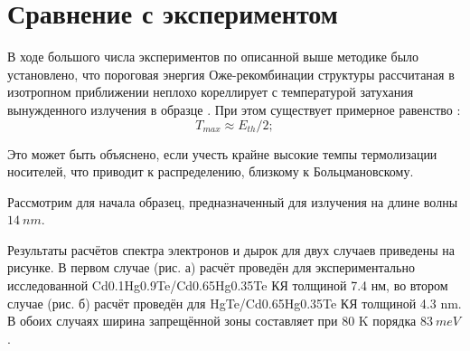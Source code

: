 \documentclass[../main.tex]{subfiles}
\begin{document}
    \section{Сравнение с экспериментом}
    В ходе большого числа экспериментов по описанной выше методике было установлено, что пороговая энергия 
    Оже-рекомбинации структуры рассчитаная в изотропном приближении неплохо кореллирует с температурой затухания 
    вынужденного излучения в образце . При этом существует примерное равенство \cite{TmaxEthEq}:
    \begin{equation}
        T_{max} \approx E_{th} / 2;
    \end{equation}

    Это может быть объяснено, если учесть крайне высокие темпы термолизации носителей, что приводит
    к распределению, близкому к Больцмановскому.

    Рассмотрим для начала образец, предназначенный для излучения на длине волны $14~nm$.

    Результаты расчётов спектра электронов и дырок для двух случаев приведены на рисунке. В первом случае (рис. а) расчёт
    проведён для экспериментально исследованной Cd0.1Hg0.9Te/Cd0.65Hg0.35Te КЯ толщиной 7.4 нм, во втором случае (рис. б)
    расчёт проведён для HgTe/Cd0.65Hg0.35Te КЯ толщиной 4.3 nm. В обоих случаях ширина запрещённой зоны составляет при 
    80 K порядка $83~meV$. 
\end{document}
